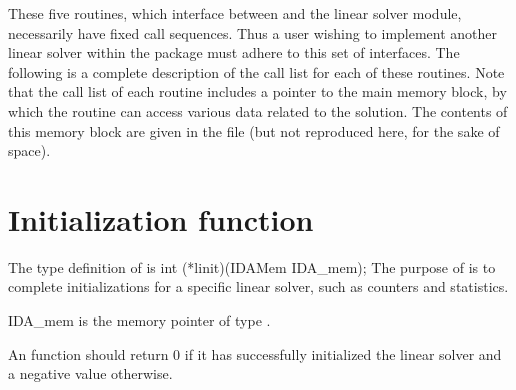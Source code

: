 \vspace{0.1in}
These five routines, which interface between {\idas} and the linear solver module,
necessarily have fixed call sequences.  Thus a user wishing to implement another 
linear solver within the {\idas} package must adhere to this set of interfaces.
The following is a complete description of the call list for each of
these routines.  Note that the call list of each routine includes a
pointer to the main {\idas} memory block, by which the routine can access
various data related to the {\idas} solution.  The contents of this memory
block are given in the file  (but not reproduced here, for
the sake of space).


\section{Initialization function}
The type definition of  is
{
  int (*linit)(IDAMem IDA\_mem);
}
{
  The purpose of  is to complete initializations for      
  a specific linear solver, such as counters and statistics.        
}
{
  \begin{args}
  \item[IDA\_mem]
    is the {\idas} memory pointer of type .
  \end{args}
}
{
  An  function should return $0$ if it 
  has successfully initialized the {\idas} linear solver and 
  a negative value otherwise. 
}
{}


